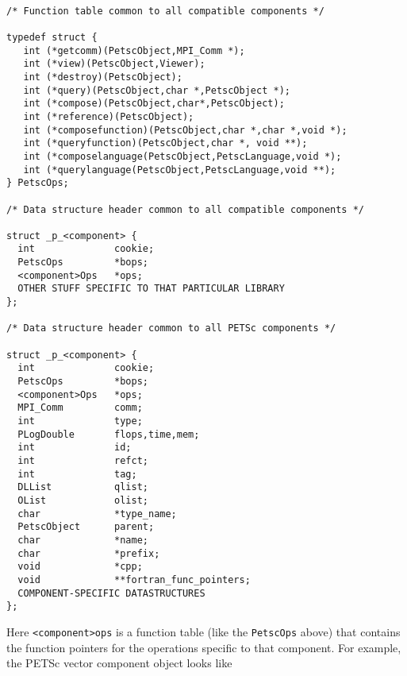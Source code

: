 \begin{verbatim}

/* Function table common to all compatible components */

typedef struct {
   int (*getcomm)(PetscObject,MPI_Comm *);
   int (*view)(PetscObject,Viewer);
   int (*destroy)(PetscObject);
   int (*query)(PetscObject,char *,PetscObject *);
   int (*compose)(PetscObject,char*,PetscObject);
   int (*reference)(PetscObject);
   int (*composefunction)(PetscObject,char *,char *,void *);
   int (*queryfunction)(PetscObject,char *, void **);
   int (*composelanguage(PetscObject,PetscLanguage,void *);
   int (*querylanguage(PetscObject,PetscLanguage,void **);
} PetscOps;

/* Data structure header common to all compatible components */

struct _p_<component> {
  int              cookie;                                  
  PetscOps         *bops;                                   
  <component>Ops   *ops;       
  OTHER STUFF SPECIFIC TO THAT PARTICULAR LIBRARY
};

/* Data structure header common to all PETSc components */

struct _p_<component> {
  int              cookie;                                  
  PetscOps         *bops;                                   
  <component>Ops   *ops;                                    
  MPI_Comm         comm;                                    
  int              type;                                    
  PLogDouble       flops,time,mem;                          
  int              id;                                      
  int              refct;                                   
  int              tag;                                     
  DLList           qlist;                                   
  OList            olist;                                   
  char             *type_name;                              
  PetscObject      parent;                                  
  char             *name;                                    
  char             *prefix;                                 
  void             *cpp;
  void             **fortran_func_pointers;       
  COMPONENT-SPECIFIC DATASTRUCTURES
}; 

\end{verbatim}
Here {\tt <component>ops} is a function table (like the {\tt PetscOps} above) that 
contains the function pointers for the operations specific to that component.
For example, the PETSc vector component object looks like

